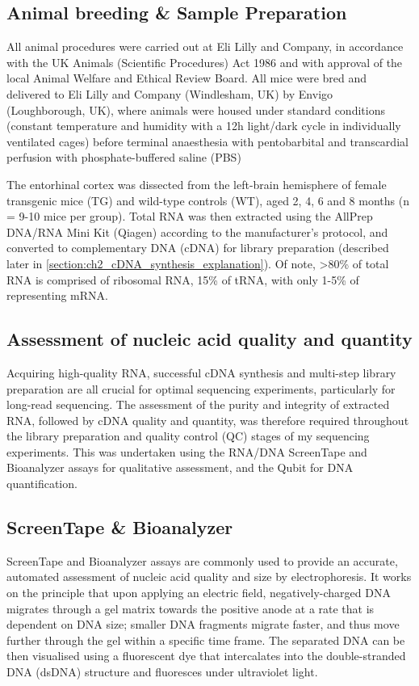 \subsection{Animal breeding \& Sample Preparation}
\label{sec: animalbreeding_sample preparation}
All animal procedures were carried out at Eli Lilly and Company, in accordance with the UK Animals (Scientific Procedures) Act 1986 and with approval of the local Animal Welfare and Ethical Review Board. All mice were bred and delivered to Eli Lilly and Company (Windlesham, UK) by Envigo (Loughborough, UK), where animals were housed under standard conditions (constant temperature and humidity with a 12h light/dark cycle in individually ventilated cages) before terminal anaesthesia with pentobarbital and transcardial perfusion with phosphate-buffered saline (PBS)\cite{Castanho2020}

The entorhinal cortex was dissected from the left-brain hemisphere of female transgenic mice (TG) and wild-type controls (WT), aged 2, 4, 6 and 8 months (n = 9-10 mice per group). Total RNA was then extracted\cite{Castanho2020} using the AllPrep DNA/RNA Mini Kit (Qiagen) according to the manufacturer's protocol, and converted to complementary DNA (cDNA) for library preparation (described later in \cref{section:ch2_cDNA_synthesis_explanation}). Of note, >80\% of total RNA is comprised of ribosomal RNA, 15\% of tRNA, with only 1-5\% of representing mRNA. 

\subsection{Assessment of nucleic acid quality and quantity}
Acquiring high-quality RNA, successful cDNA synthesis and multi-step library preparation are all crucial for optimal sequencing experiments, particularly for long-read sequencing. The assessment of the purity and integrity of extracted RNA, followed by cDNA quality and quantity, was therefore required throughout the library preparation and quality control (QC) stages of my sequencing experiments. This was undertaken using the RNA/DNA ScreenTape and Bioanalyzer assays for qualitative assessment, and the Qubit for DNA quantification. 


\subsection{ScreenTape \& Bioanalyzer}
\label{section:ch2_bioanalyzer} 
ScreenTape and Bioanalyzer assays are commonly used to provide an accurate, automated assessment of nucleic acid quality and size by electrophoresis. It works on the principle that upon applying an electric field, negatively-charged DNA migrates through a gel matrix towards the positive anode at a rate that is dependent on DNA size; smaller DNA fragments migrate faster, and thus move further through the gel within a specific time frame. The separated DNA can be then visualised using a fluorescent dye that intercalates into the double-stranded DNA (dsDNA) structure and fluoresces under ultraviolet light. 

